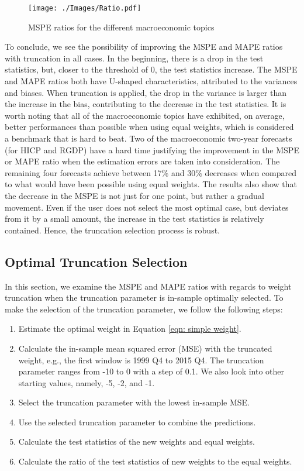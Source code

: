 \documentclass[11pt]{article}
\begin{document}
	\begin{figure}[!h]
		\centering
		\texttt{[image: ./Images/Ratio.pdf]}
		\caption{MSPE ratios for the different macroeconomic topics}\label{fig: Ratio sub}
	\end{figure}
	
	To conclude, we see the possibility of improving the MSPE and MAPE ratios with truncation in all cases. In the beginning, there is a drop in the test statistics, but, closer to the threshold of 0, the test statistics increase. The MSPE and MAPE ratios both have U-shaped characteristics, attributed to the variances and biases. When truncation is applied, the drop in the variance is larger than the increase in the bias, contributing to the decrease in the test statistics. It is worth noting that all of the macroeconomic topics have exhibited, on average, better performances than possible when using equal weights, which is considered a benchmark that is hard to beat. Two of the macroeconomic two-year forecasts (for HICP and RGDP) have a hard time justifying the improvement in the MSPE or MAPE ratio when the estimation errors are taken into consideration. The remaining four forecasts achieve between 17\% and 30\% decreases when compared to what would have been possible using equal weights. The results also show that the decrease in the MSPE is not just for one point, but rather a gradual movement. Even if the user does not select the most optimal case, but deviates from it by a small amount, the increase in the test statistics is relatively contained. Hence, the truncation selection process is robust.
	
	\subsection{Optimal Truncation Selection}\label{out-of-sample-truncation-selection}
	
	In this section, we examine the MSPE and MAPE ratios with regards to weight truncation when the truncation parameter is in-sample optimally selected. To make the selection of the truncation parameter, we follow the following steps:
	
	\begin{enumerate}
		\def\labelenumi{\arabic{enumi}.}
		\item
		Estimate the optimal weight in Equation \ref{eqn: simple weight}.
		\item
		Calculate the in-sample mean squared error (MSE) with the truncated weight, e.g., the first window is 1999 Q4 to 2015 Q4. The truncation parameter ranges from -10 to 0 with a step of 0.1. We also look into other starting values, namely, -5, -2, and -1.
		\item
		Select the truncation parameter with the lowest in-sample MSE.
		\item
		Use the selected truncation parameter to combine the predictions.
		\item
		Calculate the test statistics of the new weights and equal weights.
		\item
		Calculate the ratio of the test statistics of new weights to the equal weights.
	\end{enumerate}
	
\end{document}
